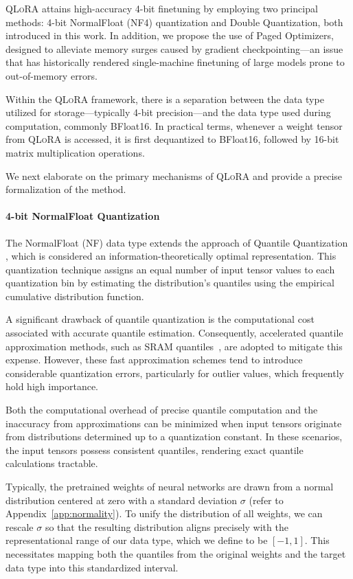 \textsc{QLoRA} attains high-accuracy 4-bit finetuning by employing two principal methods: 4-bit NormalFloat (NF4) quantization and Double Quantization, both introduced in this work. In addition, we propose the use of Paged Optimizers, designed to alleviate memory surges caused by gradient checkpointing—an issue that has historically rendered single-machine finetuning of large models prone to out-of-memory errors.

Within the \textsc{QLoRA} framework, there is a separation between the data type utilized for storage—typically 4-bit precision—and the data type used during computation, commonly BFloat16. In practical terms, whenever a weight tensor from \textsc{QLoRA} is accessed, it is first dequantized to BFloat16, followed by 16-bit matrix multiplication operations.

We next elaborate on the primary mechanisms of \textsc{QLoRA} and provide a precise formalization of the method.

\paragraph{4-bit NormalFloat Quantization} The NormalFloat (NF) data type extends the approach of Quantile Quantization \citep{dettmers2022optimizers}, which is considered an information-theoretically optimal representation. This quantization technique assigns an equal number of input tensor values to each quantization bin by estimating the distribution's quantiles using the empirical cumulative distribution function.

A significant drawback of quantile quantization is the computational cost associated with accurate quantile estimation. Consequently, accelerated quantile approximation methods, such as SRAM quantiles~\citep{dettmers2022optimizers}, are adopted to mitigate this expense. However, these fast approximation schemes tend to introduce considerable quantization errors, particularly for outlier values, which frequently hold high importance.

Both the computational overhead of precise quantile computation and the inaccuracy from approximations can be minimized when input tensors originate from distributions determined up to a quantization constant. In these scenarios, the input tensors possess consistent quantiles, rendering exact quantile calculations tractable.

Typically, the pretrained weights of neural networks are drawn from a normal distribution centered at zero with a standard deviation $\sigma$ (refer to Appendix~\ref{app:normality}). To unify the distribution of all weights, we can rescale $\sigma$ so that the resulting distribution aligns precisely with the representational range of our data type, which we define to be $[-1, 1]$. This necessitates mapping both the quantiles from the original weights and the target data type into this standardized interval.

